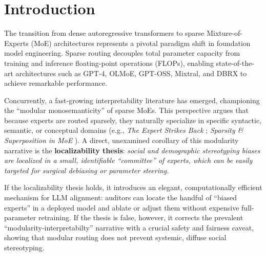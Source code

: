 \documentclass[11pt,a4paper]{article}
\begin{document}
\section{Introduction}
The transition from dense autoregressive transformers to sparse Mixture-of-Experts (MoE) architectures represents a pivotal paradigm shift in foundation model engineering. Sparse routing decouples total parameter capacity from training and inference floating-point operations (FLOPs), enabling state-of-the-art architectures such as GPT-4, OLMoE, GPT-OSS, Mixtral, and DBRX to achieve remarkable performance.

Concurrently, a fast-growing interpretability literature has emerged, championing the ``modular monosemanticity'' of sparse MoEs. This perspective argues that because experts are routed sparsely, they naturally specialize in specific syntactic, semantic, or conceptual domains (e.g., \textit{The Expert Strikes Back} \cite{expert_strikes_back}; \textit{Sparsity \& Superposition in MoE} \cite{sparsity_superposition_moe}). A direct, unexamined corollary of this modularity narrative is the \textbf{localizability thesis}: \textit{social and demographic stereotyping biases are localized in a small, identifiable ``committee'' of experts, which can be easily targeted for surgical debiasing or parameter steering.}

If the localizability thesis holds, it introduces an elegant, computationally efficient mechanism for LLM alignment: auditors can locate the handful of ``biased experts'' in a deployed model and ablate or adjust them without expensive full-parameter retraining. If the thesis is false, however, it corrects the prevalent ``modularity-interpretabilty'' narrative with a crucial safety and fairness caveat, showing that modular routing does not prevent systemic, diffuse social stereotyping.
\end{document}
